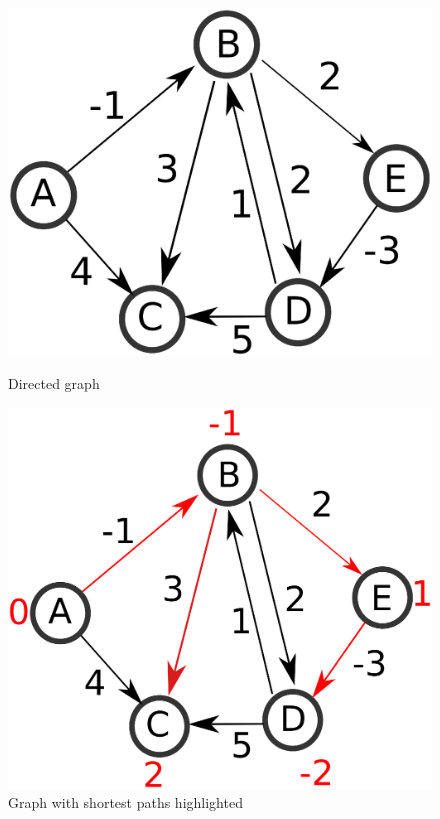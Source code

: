 \documentclass[12pt]{article}
\begin{document}
\begin{figure}[h]
	\centering
	\begin{minipage}{0.5\textwidth}
		\centering
		\includegraphics[scale=0.3]{Figures/normGraph.eps}
		\caption{Directed graph }
		\label{fig:norm}
	\end{minipage}%
	\begin{minipage}{0.5\textwidth}
		\centering		
		\includegraphics[scale=0.3]{Figures/normGraphEnd.eps}
		\caption{Graph with shortest paths highlighted}
		\label{fig:normEnd}
	\end{minipage}
\end{figure}
\end{document}
